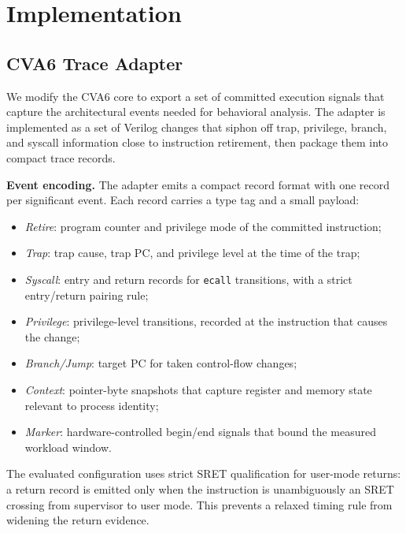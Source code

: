 \section{Implementation}
\label{sec:implementation}

\subsection{CVA6 Trace Adapter}
\label{subsec:trace-adapter}

We modify the CVA6 core to export a set of committed execution signals that capture the architectural events needed for behavioral analysis. The adapter is implemented as a set of Verilog changes that siphon off trap, privilege, branch, and syscall information close to instruction retirement, then package them into compact trace records.

\textbf{Event encoding.}
The adapter emits a compact record format with one record per significant event. Each record carries a type tag and a small payload:
\begin{itemize}
\item \textit{Retire}: program counter and privilege mode of the committed instruction;
\item \textit{Trap}: trap cause, trap PC, and privilege level at the time of the trap;
\item \textit{Syscall}: entry and return records for \texttt{ecall} transitions, with a strict entry/return pairing rule;
\item \textit{Privilege}: privilege-level transitions, recorded at the instruction that causes the change;
\item \textit{Branch/Jump}: target PC for taken control-flow changes;
\item \textit{Context}: pointer-byte snapshots that capture register and memory state relevant to process identity;
\item \textit{Marker}: hardware-controlled begin/end signals that bound the measured workload window.
\end{itemize}

The evaluated configuration uses strict SRET qualification for user-mode returns: a return record is emitted only when the instruction is unambiguously an SRET crossing from supervisor to user mode. This prevents a relaxed timing rule from widening the return evidence.

